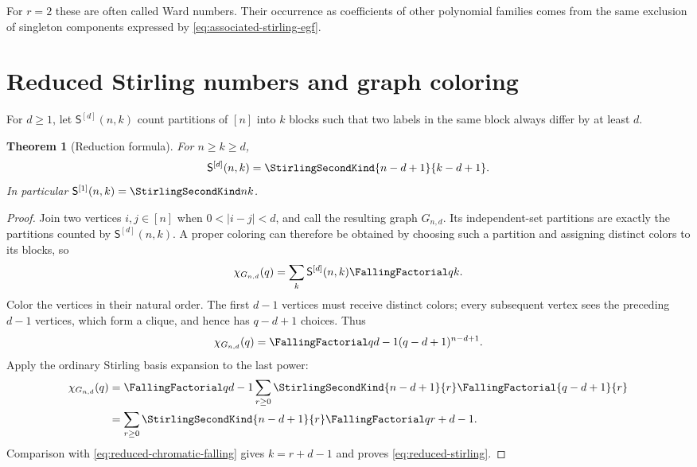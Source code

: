 \documentclass[11pt,a4paper,oneside,openany]{book}
\newtheorem{theorem}{Theorem}[chapter]
\theoremstyle{definition}
\theoremstyle{remark}
\begin{document}
For $r=2$ these are often called Ward numbers.  Their occurrence as coefficients
of other polynomial families comes from the same exclusion of singleton
components expressed by \eqref{eq:associated-stirling-egf}.

\section{Reduced Stirling numbers and graph coloring}
For $d\ge1$, let $\mathsf S^{[d]}(n,k)$ count partitions of $[n]$ into $k$ blocks
such that two labels in the same block always differ by at least $d$.

\begin{theorem}[Reduction formula]
\label{thm:reduced-stirling}
For $n\ge k\ge d$,
\begin{equation}
\label{eq:reduced-stirling}
 \mathsf S^{[d]}(n,k)=\StirlingSecondKind{n-d+1}{k-d+1}.
\end{equation}
In particular $\mathsf S^{[1]}(n,k)=\StirlingSecondKind nk$.
\end{theorem}
\begin{proof}
Join two vertices $i,j\in[n]$ when $0<|i-j|<d$, and call the resulting graph
$G_{n,d}$.  Its independent-set partitions are exactly the partitions counted by
$\mathsf S^{[d]}(n,k)$.  A proper coloring can therefore be obtained by choosing
such a partition and assigning distinct colors to its blocks, so
\begin{equation}
\label{eq:reduced-chromatic-falling}
 \chi_{G_{n,d}}(q)=\sum_k\mathsf S^{[d]}(n,k)\FallingFactorial qk.
\end{equation}
Color the vertices in their natural order.  The first $d-1$ vertices must receive
distinct colors; every subsequent vertex sees the preceding $d-1$ vertices, which
form a clique, and hence has $q-d+1$ choices.  Thus
\[
 \chi_{G_{n,d}}(q)
 =\FallingFactorial q{d-1}(q-d+1)^{n-d+1}.
\]
Apply the ordinary Stirling basis expansion to the last power:
\begin{align*}
 \chi_{G_{n,d}}(q)
 &=\FallingFactorial q{d-1}
   \sum_{r\ge0}\StirlingSecondKind{n-d+1}{r}\FallingFactorial{q-d+1}{r}\\
 &=\sum_{r\ge0}\StirlingSecondKind{n-d+1}{r}\FallingFactorial q{r+d-1}.
\end{align*}
Comparison with \eqref{eq:reduced-chromatic-falling} gives
$k=r+d-1$ and proves \eqref{eq:reduced-stirling}.
\end{proof}
\end{document}
